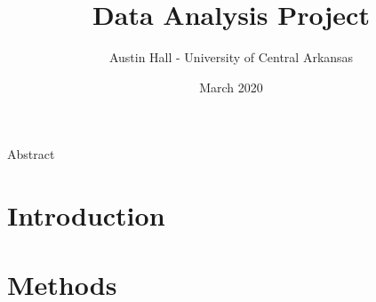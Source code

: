 \documentclass{article}
\author{Austin Hall - University of Central Arkansas}
\date{March 2020}
\title{\huge Data Analysis Project}
\begin{document}
\maketitle
\vspace{0.75cm}
\begin{center}
{\LARGE Abstract}\\
\end{center}
\large


\newpage
\section{Introduction}


\newpage
\section{Methods}


\newpage
\end{document}
